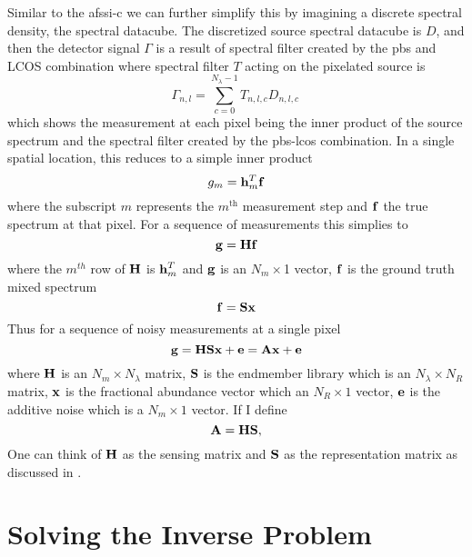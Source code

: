 Similar to the \gls{afssi-c} we can further simplify this by imagining a discrete spectral density, the spectral datacube. The discretized source spectral datacube is $D$, and then the detector signal $\Gamma$ is a result of spectral filter created by the \gls{pbs} and LCOS combination where spectral filter $T$ acting on the pixelated source is
%
%
\begin{equation}
	\Gamma_{n,l} = \sum^{N_{\lambda}-1}_{c = 0} T_{n,l,c} D_{n,l,c} \,
\end{equation}
%
%
which shows the measurement at each pixel being the inner product of the source spectrum and the spectral filter created by the \gls{pbs}-\gls{lcos} combination. In a single spatial location, this reduces to a simple inner product
%
\begin{equation}
	g_m = \displaystyle \mathbf{h}_m^{T} \displaystyle \mathbf{f} 
\end{equation}
%
where the subscript $m$ represents the $m^{\text{th}}$ measurement step and $\displaystyle \mathbf{f}$ the true spectrum at that pixel. For a sequence of measurements this simplies to 
%
\begin{equation}
	\displaystyle \mathbf{g} = \displaystyle \mathbf{H} \displaystyle \mathbf{f}
\end{equation}
%
where the $m^{th}$ row of $\displaystyle \mathbf{H}$ is $\displaystyle \mathbf{h}_m^T$ and $\displaystyle \mathbf{g}$ is an $N_m \times$1 vector, $\displaystyle \mathbf{f}$ is the ground truth mixed spectrum
%
\begin{equation}
	\displaystyle \mathbf{f} = \displaystyle \mathbf{S}\displaystyle \mathbf{x}
\end{equation}
%
Thus for a sequence of noisy measurements at a single pixel
%
\begin{equation}
	\displaystyle \mathbf{g} = \displaystyle \mathbf{H}\displaystyle \mathbf{S}\displaystyle \mathbf{x} + \displaystyle \mathbf{e} = \displaystyle \mathbf{A}\displaystyle \mathbf{x} + \displaystyle \mathbf{e}
\end{equation}\label{eq:csuForwardModel}
%
where $\displaystyle \mathbf{H}$ is an $N_m \times N_{\lambda}$ matrix, $\displaystyle \mathbf{S}$ is the endmember library which is an $N_{\lambda} \times N_{R}$ matrix, $\displaystyle \mathbf{x}$ is the fractional abundance vector which an $N_R \times 1$ vector, $\displaystyle \mathbf{e}$ is the additive noise which is a $N_m \times 1$ vector. If I define
%
\begin{equation}
	\displaystyle \mathbf{A} = \displaystyle \mathbf{H} \displaystyle \mathbf{S},
\end{equation}
%
One can think of $\displaystyle \mathbf{H}$ as the sensing matrix and $\displaystyle \mathbf{S}$ as the representation matrix as discussed in .


\section{Solving the Inverse Problem}

